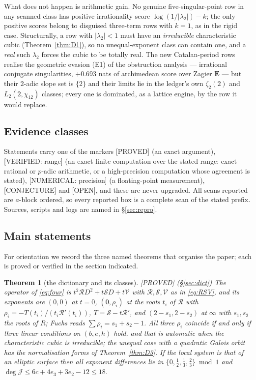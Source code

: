 \documentclass[11pt,reqno]{amsart}
\theoremstyle{plain}
\theoremstyle{definition}
\theoremstyle{remark}
\theoremstyle{plain}
\newtheorem{namedthm}{Theorem}
\newcommand{\Jm}{\mathcal J}
\newcommand{\Rc}{\mathcal R}
\newcommand{\Sc}{\mathcal S}
\newcommand{\Vc}{\mathcal V}
\newcommand{\Proved}{\textup{\textsf{[PROVED]}}}
\newcommand{\Verified}[1]{\textup{\textsf{[VERIFIED: #1]}}}
\newcommand{\Numerical}[1]{\textup{\textsf{[NUMERICAL: #1]}}}
\newcommand{\Conj}{\textup{\textsf{[CONJECTURE]}}}
\newcommand{\Open}{\textup{\textsf{[OPEN]}}}
\begin{document}
What does not happen is arithmetic gain. No genuine five-singular-point row in
any scanned class has positive irrationality score $\log(1/|\lambda_2|)-k$; the
only positive scores belong to disguised three-term rows with $k=1$, as in the
rigid case. Structurally, a row with $|\lambda_2|<1$ must have an
\emph{irreducible} characteristic cubic (Theorem~\ref{thm:D1}), so no
unequal-exponent class can contain one, and a \emph{real} such $\lambda_2$ forces
the cubic to be totally real. The new Catalan-period rows realise the geometric
evasion (E1) of the obstruction analysis \cite{CATOBS} --- irrational conjugate
singularities, $+0.693$ nats of archimedean score over Zagier $\mathbf E$ ---
but their $2$-adic slope set is $\{2\}$ and their limits lie in the ledger's own
$\zeta_2(2)$ and $L_2(2,\chi_{12})$ classes; every one is dominated, as a lattice
engine, by the row it would replace.

\subsection{Evidence classes}
Statements carry one of the markers \Proved{} (an exact argument),
\Verified{range} (an exact finite computation over the stated range: exact
rational or $p$-adic arithmetic, or a high-precision computation whose agreement
is stated), \Numerical{precision} (a floating-point measurement), \Conj{} and
\Open, and these are never upgraded. All scans reported are $a$-block ordered, so
every reported box is a complete scan of the stated prefix. Sources, scripts and
logs are named in \S\ref{sec:repro}.

\subsection{Main statements}
For orientation we record the three named theorems that organise the paper; each
is proved or verified in the section indicated.

\begin{namedthm}[the dictionary and its classes]\label{thmA}
\Proved{} \textup{(\S\ref{sec:dict})} The operator of \eqref{eq:four} is
$t^2\Rc D^2+t\Sc D+t\Vc$ with $\Rc,\Sc,\Vc$ as in \eqref{eq:RSV}, and its
exponents are $(0,0)$ at $t=0$, $(0,\rho_i)$ at the roots $t_i$ of $\Rc$ with
$\rho_i=-T(t_i)/(t_i\Rc'(t_i))$, $T=\Sc-t\Rc'$, and $(2-s_1,2-s_2)$ at $\infty$
with $s_1,s_2$ the roots of $R$; Fuchs reads $\sum\rho_i=s_1+s_2-1$. All three
$\rho_i$ coincide if and only if three \emph{linear} conditions on
$(b,e,h)$ hold, and that is automatic when the characteristic cubic is
irreducible; the unequal case with a quadratic Galois orbit has the
normalisation forms of Theorem~\ref{thm:D3}. If the local system is that of an
elliptic surface then all exponent differences lie in
$\{0,\tfrac12,\tfrac13,\tfrac23\}\bmod1$ and
$\deg\Jm\le6c+4e_3+3e_2-12\le18$.
\end{namedthm}
\end{document}
